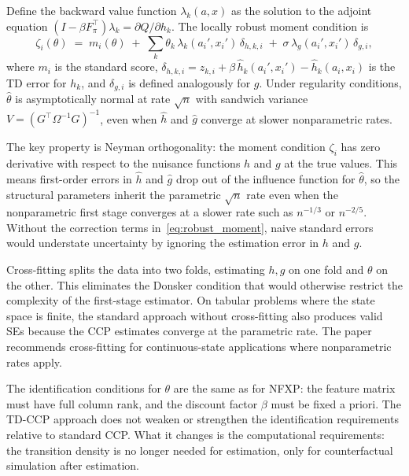 \documentclass[10pt]{article}
\begin{document}
\begin{proposition}
Define the backward value function $\lambda_k(a,x)$ as the solution to the adjoint equation $(I - \beta F_\pi^\top)\lambda_k = \partial Q / \partial h_k$.
The locally robust moment condition is
\begin{equation}
\label{eq:robust_moment}
\zeta_i(\theta) \;=\; m_i(\theta) \;+\; \sum_k \theta_k\,\lambda_k(a_i', x_i')\,\delta_{h,k,i} \;+\; \sigma\,\lambda_g(a_i', x_i')\,\delta_{g,i},
\end{equation}
where $m_i$ is the standard score, $\delta_{h,k,i} = z_{k,i} + \beta\,\hat h_k(a_i', x_i') - \hat h_k(a_i, x_i)$ is the TD error for $h_k$, and $\delta_{g,i}$ is defined analogously for $g$.
Under regularity conditions, $\hat\theta$ is asymptotically normal at rate $\sqrt{n}$ with sandwich variance $V = (G^\top \Omega^{-1} G)^{-1}$, even when $\hat h$ and $\hat g$ converge at slower nonparametric rates.
\end{proposition}

The key property is Neyman orthogonality: the moment condition $\zeta_i$ has zero derivative with respect to the nuisance functions $h$ and $g$ at the true values.
This means first-order errors in $\hat h$ and $\hat g$ drop out of the influence function for $\hat\theta$, so the structural parameters inherit the parametric $\sqrt{n}$ rate even when the nonparametric first stage converges at a slower rate such as $n^{-1/3}$ or $n^{-2/5}$.
Without the correction terms in~\eqref{eq:robust_moment}, naive standard errors would understate uncertainty by ignoring the estimation error in $h$ and $g$.

Cross-fitting \citep{chernozhukov2018} splits the data into two folds, estimating $h,g$ on one fold and $\theta$ on the other. This eliminates the Donsker condition that would otherwise restrict the complexity of the first-stage estimator.
On tabular problems where the state space is finite, the standard approach without cross-fitting also produces valid SEs because the CCP estimates converge at the parametric rate.
The paper recommends cross-fitting for continuous-state applications where nonparametric rates apply.

The identification conditions for $\theta$ are the same as for NFXP: the feature matrix must have full column rank, and the discount factor $\beta$ must be fixed a priori.
The TD-CCP approach does not weaken or strengthen the identification requirements relative to standard CCP.
What it changes is the computational requirements: the transition density is no longer needed for estimation, only for counterfactual simulation after estimation.
\end{document}
